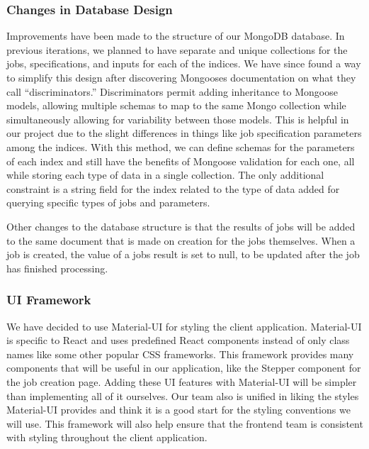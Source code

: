 \subsubsection{Changes in Database Design}
Improvements have been made to the structure of our MongoDB database. In previous iterations, we planned to have separate and unique collections for the jobs, specifications, and inputs for each of the indices. We have since found a way to simplify this design after discovering Mongoose\textquotesingle s documentation on what they call ``discriminators.'' Discriminators permit adding inheritance to Mongoose models, allowing multiple schemas to map to the same Mongo collection while simultaneously allowing for variability between those models. This is helpful in our project due to the slight differences in things like job specification parameters among the indices. With this method, we can define schemas for the parameters of each index and still have the benefits of Mongoose validation for each one, all while storing each type of data in a single collection. The only additional constraint is a string field for the index related to the type of data added for querying specific types of jobs and parameters.\par
Other changes to the database structure is that the results of jobs will be added to the same document that is made on creation for the jobs themselves. When a job is created, the value of a job\textquotesingle s result is set to null, to be updated after the job has finished processing.\par

\subsubsection{UI Framework}
We have decided to use Material-UI for styling the client application. Material-UI is specific to React and uses predefined React components instead of only class names like some other popular CSS frameworks. This framework provides many components that will be useful in our application, like the Stepper component for the job creation page. Adding these UI features with Material-UI will be simpler than implementing all of it ourselves. Our team also is unified in liking the styles Material-UI provides and think it is a good start for the styling conventions we will use. This framework will also help ensure that the frontend team is consistent with styling throughout the client application.\par

